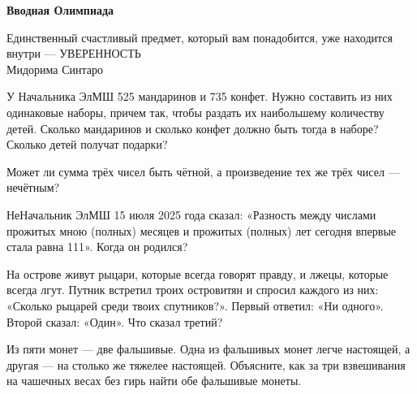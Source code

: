 \centerline{\bf \Huge Вводная Олимпиада}

\begin{flushright}
        \scriptsize{Единственный счастливый предмет, который вам понадобится, уже находится внутри — УВЕРЕННОСТЬ\\ Мидорима Синтаро}
\end{flushright}

 У Начальника ЭлМШ 525 мандаринов и 735 конфет. Нужно составить из них одинаковые наборы,
причем так, чтобы раздать их наибольшему количеству детей. Сколько мандаринов и сколько
конфет должно быть тогда в наборе? Сколько детей получат подарки?


 Может ли сумма трёх чисел быть чётной, а произведение тех же трёх чисел — нечётным?

  НеНачальник ЭлМШ 15 июля 2025 года сказал: «Разность между числами прожитых мною (полных) месяцев и прожитых (полных) лет сегодня впервые стала равна 111». Когда он родился?

 На острове живут рыцари, которые всегда говорят правду,
и лжецы, которые всегда лгут. Путник встретил троих островитян
и спросил каждого из них: «Сколько рыцарей среди твоих спутников?». Первый ответил: «Ни одного». Второй сказал: «Один».
Что сказал третий?

 Из пяти монет — две фальшивые. Одна из фальшивых монет легче
настоящей, а другая — на столько же тяжелее настоящей. Объясните, как за три взвешивания
на чашечных весах без гирь найти обе фальшивые монеты.

